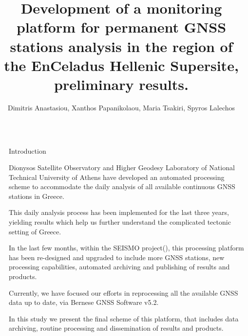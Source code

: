 \documentclass[final,a0,portrait]{beamer}
\title{Development of a monitoring platform for permanent GNSS stations analysis in the region of the EnCeladus Hellenic Supersite, preliminary results.} %
\author{Dimitris Anastasiou, Xanthos Papanikolaou, Maria Tsakiri, Spyros Lalechos}%
\institute{Dionysos Satellite Obseratory, School of Rural Surveying and Geomatics Engineering, NTUA\\ \vspace{0.3em} \par{Erthquake Planning and Protection Organization}} %
\newlength{\sepwid}
\newlength{\onecolwid}
\begin{document}

\setlength{\belowcaptionskip}{2ex} %
\setlength\belowdisplayshortskip{2ex} %

\begin{frame}[t] %

\begin{columns}[t] %

\begin{column}{\sepwid}\end{column} %

\begin{column}{\onecolwid} %


\begin{block}{Introduction}
{\small
Dionysos Satellite Observatory and Higher Geodesy Laboratory of National Technical University of Athens
have developed an automated processing scheme to accommodate the daily analysis of all available continuous GNSS stations in Greece.

This daily analysis process has been implemented for the last three years,
yielding results which help us further understand the complicated tectonic setting of Greece.

In the last few months, within the SEISMO project(\cite{dsoseismo}), 
this processing platform has been re-designed and upgraded to include more GNSS stations,
new processing capabilities, automated archiving and publishing of results and products.

Currently, we have focused our efforts in reprocessing all the available GNSS data up to date, via Bernese GNSS Software v5.2\cite{bernese}.

In this study we present the final scheme of this platform, that includes data archiving, routine processing and dissemination of results and products.

}
\end{block}
\end{column}
\end{columns}
\end{frame}
\end{document}
